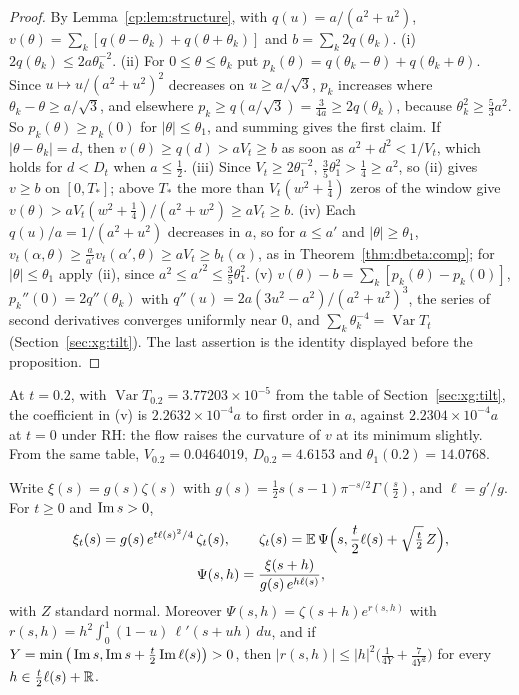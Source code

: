 \begin{proof}
By Lemma~\ref{cp:lem:structure}, with $q(u)=a/(a^2+u^2)$, $v(\theta)=\sum_k[q(\theta-\theta_k)+q(\theta+\theta_k)]$ and $b=\sum_k2q(\theta_k)$. (i) $2q(\theta_k)\le2a\theta_k^{-2}$. (ii) For $0\le\theta\le\theta_k$ put $p_k(\theta)=q(\theta_k-\theta)+q(\theta_k+\theta)$. Since $u\mapsto u/(a^2+u^2)^2$ decreases on $u\ge a/\sqrt3$, $p_k$ increases where $\theta_k-\theta\ge a/\sqrt3$, and elsewhere $p_k\ge q(a/\sqrt3)=\frac3{4a}\ge2q(\theta_k)$, because $\theta_k^2\ge\frac53a^2$. So $p_k(\theta)\ge p_k(0)$ for $|\theta|\le\theta_1$, and summing gives the first claim. If $|\theta-\theta_k|=d$, then $v(\theta)\ge q(d)>aV_t\ge b$ as soon as $a^2+d^2<1/V_t$, which holds for $d<D_t$ when $a\le\frac12$. (iii) Since $V_t\ge2\theta_1^{-2}$, $\frac35\theta_1^2>\frac14\ge a^2$, so (ii) gives $v\ge b$ on $[0,T_*]$; above $T_*$ the more than $V_t(w^2+\frac14)$ zeros of the window give $v(\theta)>aV_t(w^2+\frac14)/(a^2+w^2)\ge aV_t\ge b$. (iv) Each $q(u)/a=1/(a^2+u^2)$ decreases in $a$, so for $a\le a'$ and $|\theta|\ge\theta_1$, $v_t(\alpha,\theta)\ge\frac a{a'}v_t(\alpha',\theta)\ge aV_t\ge b_t(\alpha)$, as in Theorem~\ref{thm:dbeta:comp}; for $|\theta|\le\theta_1$ apply (ii), since $a^2\le a'^2\le\frac35\theta_1^2$. (v) $v(\theta)-b=\sum_k[p_k(\theta)-p_k(0)]$, $p_k''(0)=2q''(\theta_k)$ with $q''(u)=2a(3u^2-a^2)/(a^2+u^2)^3$, the series of second derivatives converges uniformly near $0$, and $\sum_k\theta_k^{-4}=\operatorname{Var}T_t$ (Section~\ref{sec:xg:tilt}). The last assertion is the identity displayed before the proposition.
\end{proof}

At $t=0.2$, with $\operatorname{Var}T_{0.2}=3.77203\times10^{-5}$ from the table of Section~\ref{sec:xg:tilt}, the coefficient in (v) is $2.2632\times10^{-4}a$ to first order in $a$, against $2.2304\times10^{-4}a$ at $t=0$ under RH: the flow raises the curvature of $v$ at its minimum slightly. From the same table, $V_{0.2}=0.0464019$, $D_{0.2}=4.6153$ and $\theta_1(0.2)=14.0768$.

\begin{lemma}\label{cp:lem:shift}
Write $\xi(s)=g(s)\zeta(s)$ with $g(s)=\frac12s(s-1)\pi^{-s/2}\Gamma(\frac s2)$, and $\ell=g'/g$. For $t\ge0$ and $\operatorname{Im} s>0$,
\[
\begin{gathered}\xi_t(s)=g(s)\,e^{t\ell(s)^2/4}\,\zeta_t(s),\qquad\zeta_t(s)=\mathbb{E}\,\Psi\Big(s,\frac t2\ell(s)+\sqrt{\tfrac t2}\,Z\Big),\\\Psi(s,h)=\frac{\xi(s+h)}{g(s)\,e^{h\ell(s)}},\end{gathered}
\]
with $Z$ standard normal. Moreover $\Psi(s,h)=\zeta(s+h)e^{r(s,h)}$ with $r(s,h)=h^2\int_0^1(1-u)\,\ell'(s+uh)\,du$, and if $Y=\min\big(\operatorname{Im} s,\operatorname{Im} s+\frac t2\operatorname{Im}\ell(s)\big)>0$, then $|r(s,h)|\le|h|^2\big(\frac1{4Y}+\frac7{4Y^2}\big)$ for every $h\in\frac t2\ell(s)+\mathbb{R}$.
\end{lemma}

